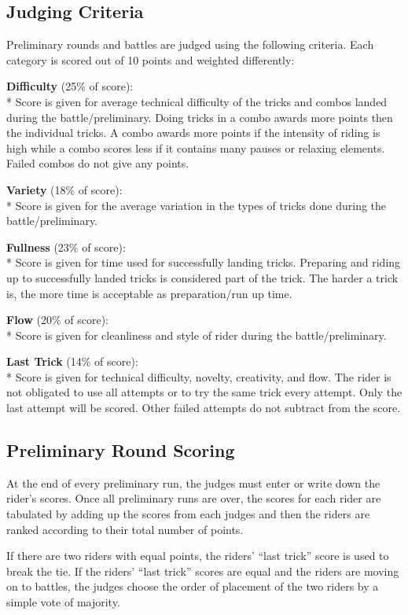 \subsection{Judging Criteria}

Preliminary rounds and battles are judged using the following criteria.
Each category is scored out of 10 points and weighted differently:

\textbf{Difficulty} (25\% of score): \\*
Score is given for average technical difficulty of the tricks and combos landed during the battle/preliminary.
Doing tricks in a combo awards more points then the individual tricks.
A combo awards more points if the intensity of riding is high while a combo scores less if it contains many pauses or relaxing elements.
Failed combos do not give any points.

\textbf{Variety} (18\% of score): \\*
Score is given for the average variation in the types of tricks done during the battle/preliminary.

\textbf{Fullness} (23\% of score): \\*
Score is given for time used for successfully landing tricks.
Preparing and riding up to successfully landed tricks is considered part of the trick.
The harder a trick is, the more time is acceptable as preparation/run up time.

\textbf{Flow} (20\% of score): \\*
Score is given for cleanliness and style of rider during the battle/preliminary.

\textbf{Last Trick} (14\% of score): \\*
Score is given for technical difficulty, novelty, creativity, and flow.
The rider is not obligated to use all attempts or to try the same trick every attempt.
Only the last attempt will be scored.
Other failed attempts do not subtract from the score.

\subsection{Preliminary Round Scoring}
At the end of every preliminary run, the judges must enter or write down the rider's scores.
Once all preliminary runs are over, the scores for each rider are tabulated by adding up the scores from each judges and then the riders are ranked according to their total number of points.

If there are two riders with equal points, the riders' ``last trick'' score is used to break the tie.
If the riders' ``last trick'' scores are equal and the riders are moving on to battles, the judges choose the order of placement of the two riders by a simple vote of majority.

